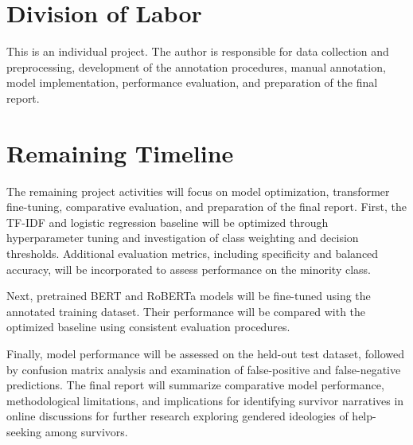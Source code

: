 \documentclass[11pt,a4paper]{article}
\begin{document}
\section{Division of Labor}
This is an individual project. The author is responsible for data collection and preprocessing, development of the annotation procedures, manual annotation, model implementation, performance evaluation, and preparation of the final report.


\section{Remaining Timeline}
The remaining project activities will focus on model optimization, transformer fine-tuning, comparative evaluation, and preparation of the final report. First, the TF-IDF and logistic regression baseline will be optimized through hyperparameter tuning and investigation of class weighting and decision thresholds. Additional evaluation metrics, including specificity and balanced accuracy, will be incorporated to assess performance on the minority class. 

Next, pretrained BERT and RoBERTa models will be fine-tuned using the annotated training dataset. Their performance will be compared with the optimized baseline using consistent evaluation procedures. 

Finally, model performance will be assessed on the held-out test dataset, followed by confusion matrix analysis and examination of false-positive and false-negative predictions. The final report will summarize comparative model performance, methodological limitations, and implications for identifying survivor narratives in online discussions for further research exploring gendered ideologies of help-seeking among survivors.




\end{document}
